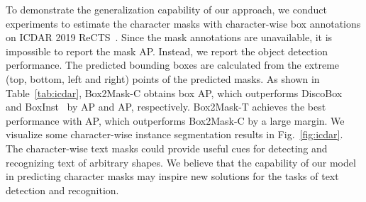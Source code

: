 \documentclass[12pt,onecolumn,letterpaper]{article}
\begin{document}
To demonstrate the generalization capability of our approach, we conduct experiments to estimate the character masks with character-wise box annotations on ICDAR 2019 ReCTS~\cite{zhang2019icdar}. 
Since the mask annotations are unavailable, it is impossible to report the mask AP. Instead, we report the object detection performance. The predicted bounding boxes are calculated from the extreme (top, bottom, left and right) points of the predicted masks.
As shown in Table~\ref{tab:icdar},  Box2Mask-C obtains  box AP, which outperforms DiscoBox~\cite{iccv2021discobox} and BoxInst~\cite{cvpr2021_boxinst} by  AP and  AP, respectively. Box2Mask-T achieves the best performance with  AP, which outperforms Box2Mask-C by a large margin. 
We visualize some character-wise instance segmentation results in Fig.~\ref{fig:icdar}.
The character-wise text masks could provide useful cues for detecting and recognizing text of arbitrary shapes. We believe that the capability of our model in predicting character masks may inspire new solutions for the tasks of text detection and recognition.
\end{document}

